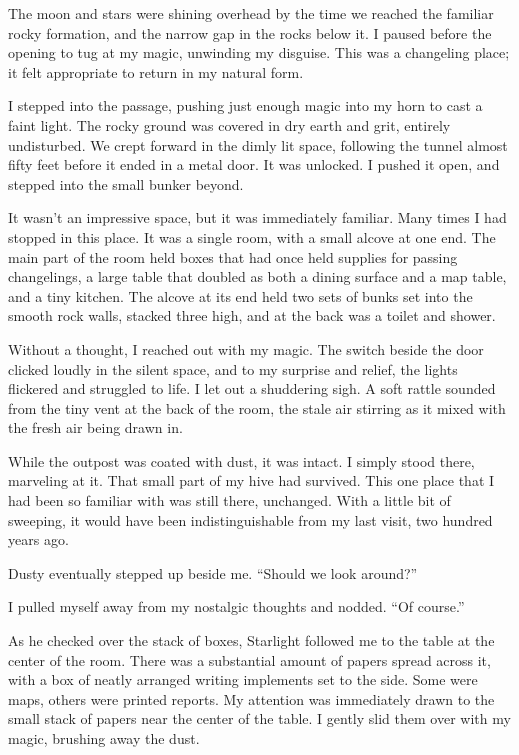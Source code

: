The moon and stars were shining overhead by the time we reached the familiar rocky formation, and the narrow gap in the rocks below it. I paused before the opening to tug at my magic, unwinding my disguise. This was a changeling place; it felt appropriate to return in my natural form.

I stepped into the passage, pushing just enough magic into my horn to cast a faint light. The rocky ground was covered in dry earth and grit, entirely undisturbed. We crept forward in the dimly lit space, following the tunnel almost fifty feet before it ended in a metal door. It was unlocked. I pushed it open, and stepped into the small bunker beyond.

It wasn’t an impressive space, but it was immediately familiar. Many times I had stopped in this place. It was a single room, with a small alcove at one end. The main part of the room held boxes that had once held supplies for passing changelings, a large table that doubled as both a dining surface and a map table, and a tiny kitchen. The alcove at its end held two sets of bunks set into the smooth rock walls, stacked three high, and at the back was a toilet and shower.

Without a thought, I reached out with my magic. The switch beside the door clicked loudly in the silent space, and to my surprise and relief, the lights flickered and struggled to life. I let out a shuddering sigh. A soft rattle sounded from the tiny vent at the back of the room, the stale air stirring as it mixed with the fresh air being drawn in.

While the outpost was coated with dust, it was intact. I simply stood there, marveling at it. That small part of my hive had survived. This one place that I had been so familiar with was still there, unchanged. With a little bit of sweeping, it would have been indistinguishable from my last visit, two hundred years ago.

Dusty eventually stepped up beside me. “Should we look around?”

I pulled myself away from my nostalgic thoughts and nodded. “Of course.”

As he checked over the stack of boxes, Starlight followed me to the table at the center of the room. There was a substantial amount of papers spread across it, with a box of neatly arranged writing implements set to the side. Some were maps, others were printed reports. My attention was immediately drawn to the small stack of papers near the center of the table. I gently slid them over with my magic, brushing away the dust.

